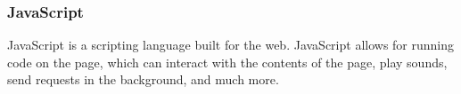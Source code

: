 \subsubsection*{JavaScript}

JavaScript is a scripting language built for the web.
JavaScript allows for running code on the page, which can interact with the contents of the page, play sounds, send requests in the background, and much more.\cite{nixonweb}


